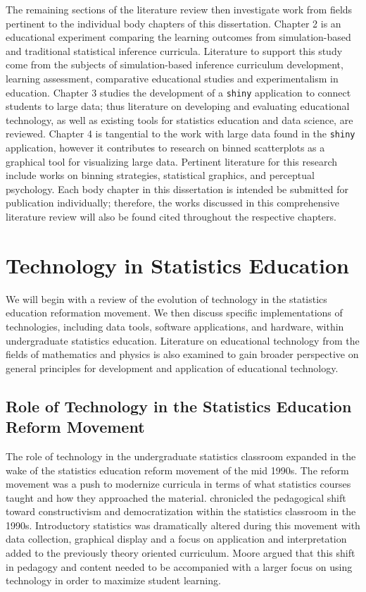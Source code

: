 \documentclass[11pt]{isuthesis}\usepackage[]{graphicx}\usepackage[]{color}
\begin{document}
The remaining sections of the literature review then investigate work from fields pertinent to the individual body chapters of this dissertation. Chapter 2 is an educational experiment comparing the learning outcomes from simulation-based and traditional statistical inference curricula. Literature to support this study come from the subjects of simulation-based inference curriculum development, learning assessment, comparative educational studies and experimentalism in education. Chapter 3 studies the development of a \texttt{shiny} \citep{shiny} application to connect students to large data; thus literature on developing and evaluating educational technology, as well as existing tools for statistics education and data science, are reviewed. Chapter 4 is tangential to the work with large data found in the \texttt{shiny} application, however it contributes to research on binned scatterplots as a graphical tool for visualizing large data. Pertinent literature for this research include works on binning strategies, statistical graphics, and perceptual psychology. Each body chapter in this dissertation is intended be submitted for publication individually; therefore, the works discussed in this comprehensive literature review will also be found cited throughout the respective chapters.

\section{Technology in Statistics Education}
\label{EdTech}

We will begin with a review of the evolution of technology in the statistics education reformation movement. We then discuss specific implementations of technologies, including data tools, software applications, and hardware, within undergraduate statistics education. Literature on educational technology from the fields of mathematics and physics is also examined to gain broader perspective on general principles for development and application of educational technology.  

\subsection{Role of Technology in the Statistics Education Reform Movement}

The role of technology in the undergraduate statistics classroom expanded in the wake of the statistics education reform movement of the mid 1990s. The reform movement was a push to modernize curricula in terms of  what statistics courses taught and how they approached the material. \citet{Moore1997} chronicled the pedagogical shift toward constructivism and democratization within the statistics classroom in the 1990s. Introductory statistics was dramatically altered during this movement with data collection, graphical display and a focus on application and interpretation added to the previously theory oriented curriculum. Moore argued that this shift in pedagogy and content needed to be accompanied with a larger focus on using technology in order to maximize student learning. 
\end{document}
